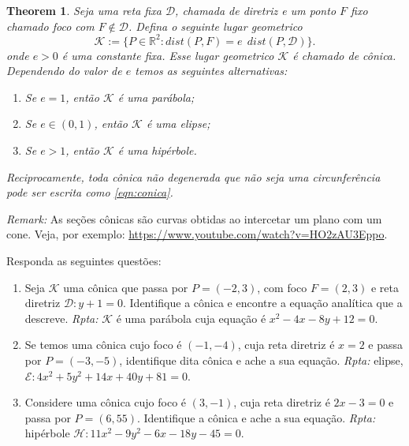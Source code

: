 \documentclass{article}
\newtheorem{theorem}{Theorem}[section]
\begin{document}
\begin{theorem}
     Seja uma reta fixa $\mathcal{D}$, chamada de diretriz e um ponto 
     $F$ fixo chamado foco com $F \notin \mathcal{D}$. 
     Defina o seguinte lugar geometrico
     \begin{equation}\label{eqn:conica}
  \mathcal{K}:=
  \{P \in \mathbb{R}^2: dist(P,F)=e \ \ dist(P, \mathcal{D})\}.
     \end{equation}      
     onde $e>0$ é uma constante fixa. 
     Esse lugar geometrico $\mathcal{K}$ é chamado de cônica. Dependendo do valor de $e$ temos as seguintes alternativas: 
     \begin{enumerate}
     \item Se $e=1$, então $\mathcal{K}$ é uma parábola;
     \item Se $e \in (0,1)$, então $\mathcal{K}$ é uma elipse; 
     \item Se $e>1$, então $\mathcal{K}$ é uma hipérbole.
     \end{enumerate}
     Reciprocamente, toda cônica não degenerada que não seja 
     uma circunferência pode ser escrita como \eqref{eqn:conica}.
\end{theorem}    
{\it Remark: } As seções cônicas são curvas obtidas ao intercetar um plano com um cone. Veja, por exemplo:  
\url{https://www.youtube.com/watch?v=HO2zAU3Eppo}.

Responda as seguintes questões:

   \begin{enumerate}
   \item Seja $\mathcal{K}$ uma cônica que passa 
   por $P=(-2,3)$, 
   com foco $F=(2,3)$ e reta diretriz $\mathcal{D}:y+1=0$. 
   Identifique a cônica e encontre a equação analítica que a descreve.
   {\it Rpta: } $\mathcal{K}$ é uma parábola cuja equação 
   é $x^2-4x-8y+12=0$. 
   \item Se temos uma cônica cujo foco é $(-1,-4)$, cuja reta diretriz é 
   $x=2$ e passa por $P=(-3,-5)$, 
   identifique dita cônica e ache a sua equação.
   {\it Rpta: } elipse, $\mathcal{E}: 4x^2+5y^2+14x+40y+81=0$. 
   \item Considere uma cônica cujo foco é $(3,-1)$, cuja reta diretriz é 
   $2x-3=0$ e passa por $P=(6,55)$.  
   Identifique a cônica e ache a sua equação.
   {\it Rpta: } hipérbole $\mathcal{H}: 11x^2-9y^2-6x-18y-45=0$. 
   \end{enumerate}
\end{document}
